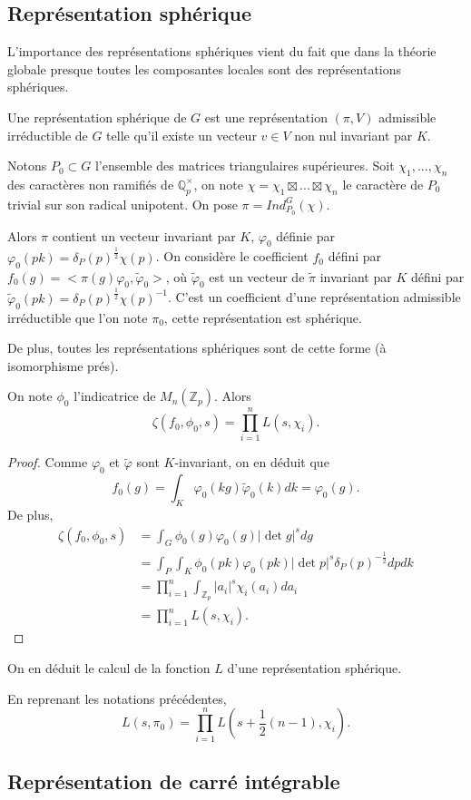 \subsection{Représentation sphérique}

L'importance des représentations sphériques vient du fait que dans la théorie globale presque toutes les composantes locales sont des représentations sphériques.

\begin{definition}
Une représentation sphérique de $G$ est une représentation $(\pi, V)$ admissible irréductible de $G$ telle qu'il existe un vecteur $v \in V$ non nul invariant par $K$.
\end{definition}

Notons $P_0 \subset G$ l'ensemble des matrices triangulaires supérieures. Soit $\chi_1, ..., \chi_n$ des caractères non ramifiés de $\mathbb{Q}_p^\times$, on note $\chi = \chi_1 \boxtimes ... \boxtimes \chi_n$ le caractère de $P_0$ trivial sur son radical unipotent. On pose $\pi = Ind_{P_0}^G(\chi)$.

Alors $\pi$ contient un vecteur invariant par $K$, $\varphi_0$ définie par $\varphi_0(pk)=\delta_P(p)^{\frac{1}{2}}\chi(p)$. On considère le coefficient $f_0$ défini par $f_0(g)=<\pi(g)\varphi_0, \tilde{\varphi}_0>$, où $\tilde{\varphi}_0$ est un vecteur de $\tilde{\pi}$ invariant par $K$ défini par $\tilde{\varphi}_0(pk)=\delta_P(p)^{\frac{1}{2}}\chi(p)^{-1}$. C'est un coefficient d'une représentation admissible irréductible que l'on note $\pi_0$, cette représentation est sphérique.

De plus, toutes les représentations sphériques sont de cette forme (à isomorphisme prés).

\begin{lemme}
On note $\phi_0$ l'indicatrice de $M_n(\mathbb{Z}_p)$. Alors
\begin{equation}
\zeta(f_0, \phi_0, s) = \prod_{i=1}^n L(s, \chi_i).
\end{equation}
\end{lemme}

\begin{proof}
Comme $\varphi_0$ et $\tilde{\varphi}$ sont $K$-invariant, on en déduit que
\begin{equation}
f_0(g)=\int_K \varphi_0(kg)\tilde{\varphi}_0(k)dk=\varphi_0(g).
\end{equation}
De plus,
\begin{align}
\zeta(f_0, \phi_0, s) &= \int_G \phi_0(g)\varphi_0(g)|\det g|^s dg \\
&= \int_P \int_K \phi_0(pk) \varphi_0(pk) |\det p|^s \delta_P(p)^{-\frac{1}{2}}dp dk \\
&= \prod_{i=1}^n \int_{\mathbb{Z}_p}|a_i|^s\chi_i(a_i)da_i \\
&= \prod_{i=1}^n L(s, \chi_i).
\end{align}
\end{proof}

On en déduit le calcul de la fonction $L$ d'une représentation sphérique.
\begin{proposition}
En reprenant les notations précédentes,
\begin{equation}
L(s, \pi_0) = \prod_{i=1}^n L(s+\frac{1}{2}(n-1), \chi_i).
\end{equation}
\end{proposition}
\subsection{Représentation de carré intégrable}